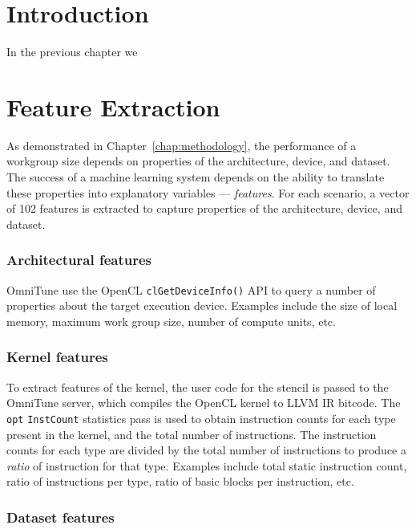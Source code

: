 \section{Introduction}

In the previous chapter we


\section{Feature Extraction}

As demonstrated in Chapter~\ref{chap:methodology}, the performance of
a workgroup size depends on properties of the architecture, device,
and dataset. The success of a machine learning system depends on the
ability to translate these properties into explanatory variables ---
\emph{features}. For each scenario, a vector of 102 features is
extracted to capture properties of the architecture, device, and
dataset.


\subsubsection{Architectural features}

OmniTune use the OpenCL \texttt{clGetDeviceInfo()} API to query a
number of properties about the target execution device. Examples
include the size of local memory, maximum work group size, number of
compute units, etc.


\subsubsection{Kernel features}

To extract features of the kernel, the user code for the stencil is
passed to the OmniTune server, which compiles the OpenCL kernel to
LLVM IR bitcode. The \texttt{opt} \texttt{InstCount} statistics pass
is used to obtain instruction counts for each type present in the
kernel, and the total number of instructions. The instruction counts
for each type are divided by the total number of instructions to
produce a \emph{ratio} of instruction for that type. Examples include
total static instruction count, ratio of instructions per type, ratio
of basic blocks per instruction, etc.



\subsubsection{Dataset features}

